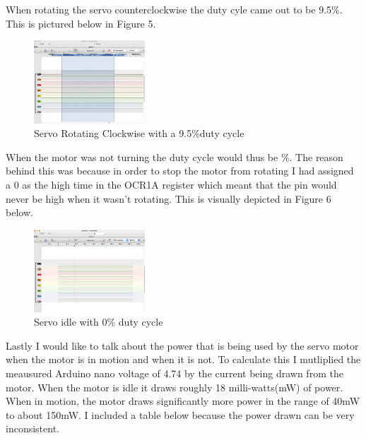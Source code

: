 \documentclass[11pt,pdftex,portrait,letterpaper]{article}
\begin{document}
	When rotating the servo counterclockwise the duty cyle came out to be 9.5\%. This is pictured below in Figure 5.
	\begin{figure}[h]
		\centering
		\includegraphics[width=0.37\textwidth]{./program2_counterclockwise}	%
		\caption{Servo Rotating Clockwise with a 9.5\%duty cycle}
		\label{f:fig1}	%
	\end{figure}
	
	When the motor was not turning the duty cycle would thus be \%. The reason behind this was because in order to stop the motor from rotating I had assigned a 0 as the high time in the OCR1A register which meant that the pin would never be high when it wasn't rotating. This is visually depicted in Figure 6 below.
		\begin{figure}[h]
		\centering
		\includegraphics[width=0.37\textwidth]{./program2_noRotations}	%
		\caption{Servo idle with 0\% duty cycle}
		\label{f:fig1}	%
	\end{figure}

	Lastly I would like to talk about the power that is being used by the servo motor when the motor is in motion and when it is not. To calculate this I mutliplied the meausured Arduino nano voltage of 4.74 by the current being drawn from the motor. When the motor is idle it draws roughly 18 milli-watts(mW) of power. When in motion, the motor draws significantly more power in the range of 40mW to about 150mW. I included a table below because the power drawn can be very inconsistent.
	
\end{document}
